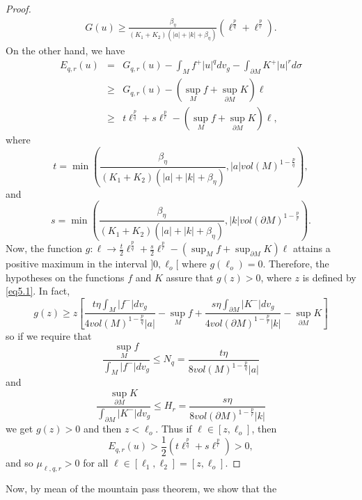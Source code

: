 \documentclass{Tran-l}
\theoremstyle{definition}
\theoremstyle{remark}
\numberwithin{equation}{section}
\begin{document}
\begin{proof}
\begin{eqnarray*}
G(u)\geq\frac{\beta_\eta}
{(K_1+K_2)(|a|+|k|+\beta_\eta)}(\ell^{\frac{p}{q}}+\ell^{\frac{p}{r}}).
\end{eqnarray*}
On the other hand, we have
\begin{eqnarray*}
    E_{q,r}(u)&=&G_{q,r}(u)-\int_Mf^+|u|^qdv_g-\int_{\partial
    M}K^+|u|^rd\sigma\\&\geq&G_{q,r}(u)-(\sup_Mf+\sup_{\partial
    M}K)\ell\\&\geq& t\ell^{\frac{p}{q}}+s\ell^{\frac{p}{r}}-(\sup_Mf+\sup_{\partial
    M}K)\ell,
\end{eqnarray*}
where
\begin{equation*}
t=\min\left(\frac{\beta_\eta} {(K_1+K_2)(|a|+|k|+\beta_\eta)},
|a|vol(M)^{1-\frac{p}{q}}\right),
\end{equation*}
and
\begin{equation*}
s=\min\left(\frac{\beta_\eta} {(K_1+K_2)(|a|+|k|+\beta_\eta)},
|k|vol(\partial M)^{1-\frac{p}{r}}\right).
\end{equation*}
Now, the function $g:\ell\longrightarrow
\frac{t}{2}\ell^{\frac{p}{q}}+\frac{s}{2}\ell^{\frac{p}{r}}-(\sup_Mf+\sup_{\partial
M}K)\ell$ attains a positive maximum in the interval $]0,\ell_o[$
where $g(\ell_o)=0$. Therefore, the hypotheses on the functions $f$
and $K$ assure that $g(z)>0$, where $z$ is defined by \eqref{eq5.1}.
In fact,
\begin{equation*}
    g(z)\geq z\left[\frac{t\eta\int_M|f^-|dv_g}
{4vol(M)^{1-\frac{p}{q}}|a|}-\sup_Mf+\frac{s\eta\int_{\partial
M}|K^-|dv_g} {4vol(\partial M)^{1-\frac{p}{r}}|k|}-\sup_{\partial
M}K\right]
\end{equation*}
so if we require that
\begin{equation*}
    \frac{\sup_Mf}{\int_M|f^-|dv_g}\leq N_q=\frac{t\eta}{8vol(M)^{1-\frac{p}{q}}|a|}
\end{equation*}
and
\begin{equation*}
\frac{\sup_{\partial M}K}{\int_{\partial M}|K^-|dv_g}\leq
H_r=\frac{s\eta}{8vol(\partial M)^{1-\frac{p}{r}}|k|}
\end{equation*}
we get $g(z)>0$ and then $z<\ell_o$. Thus if
$\ell\in\left[z,\ell_o\right]$, then
\begin{equation*}
    E_{q,r}(u)>\frac{1}{2}(t\ell^{\frac{p}{q}}+s\ell^{\frac{p}{r}})>0,
\end{equation*}
and so $\mu_{\ell,q,r}>0$  for all
$\ell\in\left[\ell_1,\ell_2\right]=\left[z,\ell_o\right]$.
\end{proof}
Now, by mean of the mountain pass theorem, we show that the
\end{document}
